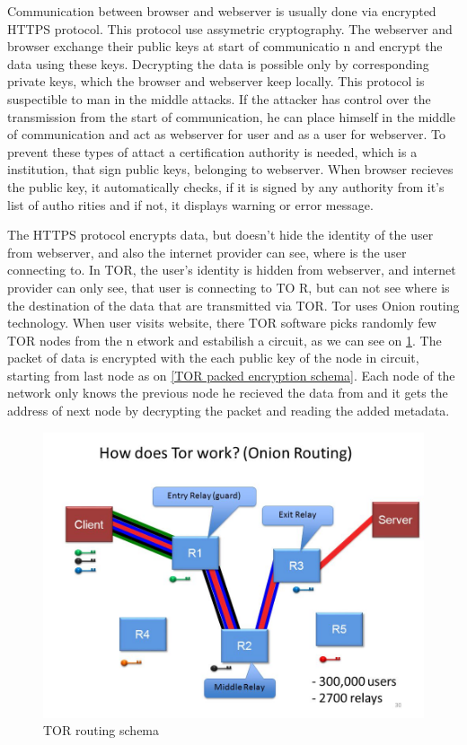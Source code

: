 \documentclass[
  digital, %
  table,   %
  lof,     %
  lot,     %
  oneside
]{fithesis3}
\begin{document}
Communication between browser and webserver is usually done via encrypted HTTPS protocol.
This protocol use assymetric cryptography. The webserver and browser exchange their public keys at start of communicatio
n
and encrypt the data using these keys. Decrypting the data is possible only by corresponding private keys,
which the browser and webserver keep locally. This protocol is suspectible to man in the middle attacks.
If the attacker has control over the transmission from the start of communication, he can place himself in the middle
 of communication and act as webserver for user and as a user for webserver. To prevent these types of attact
 a certification authority is needed, which is a institution, that sign public keys, belonging to webserver.
 When browser recieves the public key, it automatically checks, if it is signed by any authority from it's list of autho
rities
 and if not, it displays warning or error message.
 
The HTTPS protocol encrypts data, but doesn't hide the identity of the user from webserver,
 and also the internet provider can see, where is the user connecting to.
 In TOR, the user's identity is hidden from webserver, and internet provider can only see, that user is connecting to TO
R,
 but can not see where is the destination of the data that are transmitted via TOR.
 Tor uses Onion routing technology. When user visits website, there TOR software picks randomly few TOR nodes from the n
etwork
 and estabilish a circuit, as we can see on \ref{TOR routing schema}. 
 The packet of data is encrypted with the each public key of the node in circuit, starting from last node as on \ref{TOR
 packed encryption schema}.
 Each node of the network only knows the previous node he recieved the data from and it gets the address 
 of next node by decrypting the packet and reading the added metadata.
 
 \begin{figure}[!htb]
    \centering
    \includegraphics[width=1\textwidth]{tor-prejate}
    \caption{TOR routing schema}
    \label{TOR routing schema}
\end{figure}
 
\end{document}

